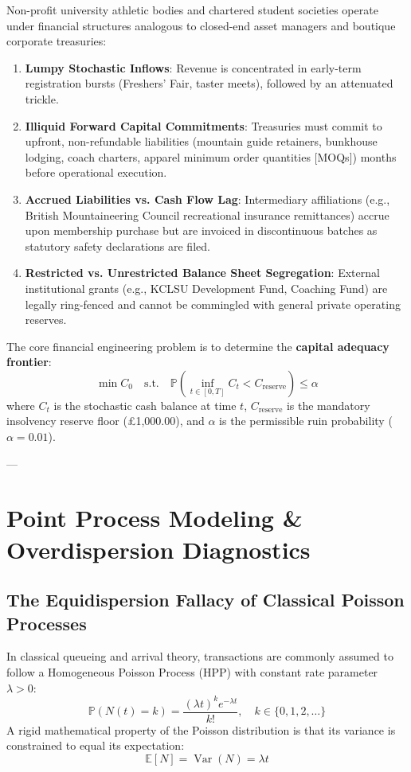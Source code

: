 \documentclass[11pt,a4paper]{article}
\begin{document}
Non-profit university athletic bodies and chartered student societies operate under financial structures analogous to closed-end asset managers and boutique corporate treasuries:
\begin{enumerate}[leftmargin=1.5em]
    \item \textbf{Lumpy Stochastic Inflows}: Revenue is concentrated in early-term registration bursts (Freshers' Fair, taster meets), followed by an attenuated trickle.
    \item \textbf{Illiquid Forward Capital Commitments}: Treasuries must commit to upfront, non-refundable liabilities (mountain guide retainers, bunkhouse lodging, coach charters, apparel minimum order quantities [MOQs]) months before operational execution.
    \item \textbf{Accrued Liabilities vs. Cash Flow Lag}: Intermediary affiliations (e.g., British Mountaineering Council recreational insurance remittances) accrue upon membership purchase but are invoiced in discontinuous batches as statutory safety declarations are filed.
    \item \textbf{Restricted vs. Unrestricted Balance Sheet Segregation}: External institutional grants (e.g., KCLSU Development Fund, Coaching Fund) are legally ring-fenced and cannot be commingled with general private operating reserves.
\end{enumerate}

The core financial engineering problem is to determine the \textbf{capital adequacy frontier}:
\begin{equation}
\min C_0 \quad \text{s.t.} \quad \mathbb{P}\left(\inf_{t \in [0, T]} C_t < C_{\text{reserve}}\right) \le \alpha
\end{equation}
where $C_t$ is the stochastic cash balance at time $t$, $C_{\text{reserve}}$ is the mandatory insolvency reserve floor (\pounds 1,000.00), and $\alpha$ is the permissible ruin probability ($\alpha = 0.01$).

---

\section{Point Process Modeling \& Overdispersion Diagnostics}

\subsection{The Equidispersion Fallacy of Classical Poisson Processes}
In classical queueing and arrival theory, transactions are commonly assumed to follow a Homogeneous Poisson Process (HPP) with constant rate parameter $\lambda > 0$:
\begin{equation}
\mathbb{P}(N(t) = k) = \frac{(\lambda t)^k e^{-\lambda t}}{k!}, \quad k \in \{0, 1, 2, \dots\}
\end{equation}
A rigid mathematical property of the Poisson distribution is that its variance is constrained to equal its expectation:
\begin{equation}
\mathbb{E}[N] = \operatorname{Var}(N) = \lambda t
\end{equation}
\end{document}
